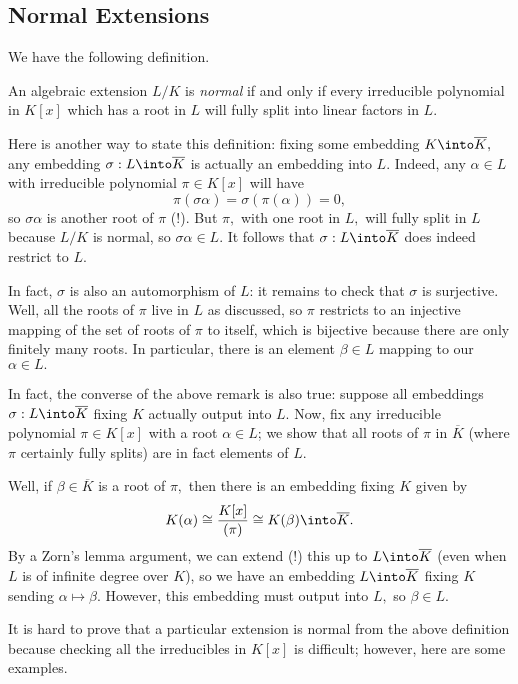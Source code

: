 \documentclass[../notes.tex]{subfiles}
\begin{document}
\subsection{Normal Extensions}
We have the following definition.
\begin{definition}
	An algebraic extension $L/K$ is \textit{normal} if and only if every irreducible polynomial in $K[x]$ which has a root in $L$ will fully split into linear factors in $L.$
\end{definition}
\begin{remark}[Nir] \label{rem:embedisauto}
	Here is another way to state this definition: fixing some embedding $K\into\overline K,$ any embedding $\sigma:L\into\overline K$ is actually an embedding into $L.$ Indeed, any $\alpha\in L$ with irreducible polynomial $\pi\in K[x]$ will have
	\[\pi(\sigma\alpha)=\sigma(\pi(\alpha))=0,\]
	so $\sigma\alpha$ is another root of $\pi$ (!). But $\pi,$ with one root in $L,$ will fully split in $L$ because $L/K$ is normal, so $\sigma\alpha\in L.$ It follows that $\sigma:L\into\overline K$ does indeed restrict to $L.$

	In fact, $\sigma$ is also an automorphism of $L$: it remains to check that $\sigma$ is surjective. Well, all the roots of $\pi$ live in $L$ as discussed, so $\pi$ restricts to an injective mapping of the set of roots of $\pi$ to itself, which is bijective because there are only finitely many roots. In particular, there is an element $\beta\in L$ mapping to our $\alpha\in L.$
\end{remark}
\begin{remark}[Nir] \label{rem:embedisautoconv}
	In fact, the converse of the above remark is also true: suppose all embeddings $\sigma:L\into\overline K$ fixing $K$ actually output into $L.$ Now, fix any irreducible polynomial $\pi\in K[x]$ with a root $\alpha\in L$; we show that all roots of $\pi$ in $\overline K$ (where $\pi$ certainly fully splits) are in fact elements of $L.$

	Well, if $\beta\in\overline K$ is a root of $\pi,$ then there is an embedding fixing $K$ given by
	\[K(\alpha)\cong\frac{K[x]}{(\pi)}\cong K(\beta)\into\overline K.\]
	By a Zorn's lemma argument, we can extend (!) this up to $L\into\overline K$ (even when $L$ is of infinite degree over $K$), so we have an embedding $L\into\overline K$ fixing $K$ sending $\alpha\mapsto\beta.$ However, this embedding must output into $L,$ so $\beta\in L.$
\end{remark}
It is hard to prove that a particular extension is normal from the above definition because checking all the irreducibles in $K[x]$ is difficult; however, here are some examples.
\end{document}
